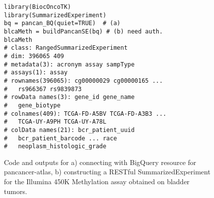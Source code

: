 \begin{figure}
{\small
\begin{verbatim}
library(BiocOncoTK)
library(SummarizedExperiment)
bq = pancan_BQ(quiet=TRUE)  # (a)
blcaMeth = buildPancanSE(bq) # (b) need auth.
blcaMeth
# class: RangedSummarizedExperiment 
# dim: 396065 409 
# metadata(3): acronym assay sampType
# assays(1): assay
# rownames(396065): cg00000029 cg00000165 ...
#   rs966367 rs9839873
# rowData names(3): gene_id gene_name
#   gene_biotype
# colnames(409): TCGA-FD-A5BV TCGA-FD-A3B3 ...
#   TCGA-UY-A9PH TCGA-UY-A78L
# colData names(21): bcr_patient_uuid
#   bcr_patient_barcode ... race
#   neoplasm_histologic_grade
\end{verbatim}
}
\caption{
Code and outputs for a) connecting with 
BigQuery resource for pancancer-atlas, b)
constructing a RESTful SummarizedExperiment
for the Illumina 450K Methylation assay obtained
on bladder tumors.
}
\label{bladcan}
\end{figure}

